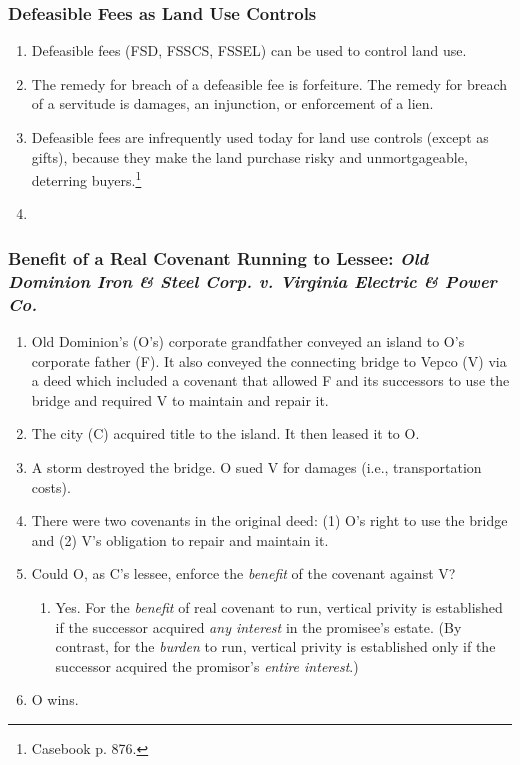\subsubsection{Defeasible Fees as Land Use Controls}

\begin{enumerate}
    \item Defeasible fees (FSD, FSSCS, FSSEL) can be used to control land use.
    \item The remedy for breach of a defeasible fee is forfeiture. The remedy 
    for breach of a servitude is damages, an injunction, or enforcement of a 
    lien.
    \item Defeasible fees are infrequently used today for land use controls 
    (except as gifts), because they make the land purchase risky and 
    unmortgageable, deterring buyers.\footnote{Casebook p. 876.}
    \item %
\end{enumerate}

\subsubsection{Benefit of a Real Covenant Running to Lessee: \emph{Old 
Dominion Iron \& Steel Corp. v. Virginia Electric \& Power Co.}}

\begin{enumerate}
    \item Old Dominion's (O's) corporate grandfather conveyed an island to O's 
    corporate father (F). It also conveyed the connecting bridge to Vepco (V) 
    via a deed which included a covenant that allowed F and its successors to 
    use the bridge and required V to maintain and repair it.
    \item The city (C) acquired title to the island. It then leased it to O.
    \item A storm destroyed the bridge. O sued V for damages (i.e., 
    transportation costs).
    \item There were two covenants in the original deed: (1) O's right to use 
    the bridge and (2) V's obligation to repair and maintain it.
    \item Could O, as C's lessee, enforce the \emph{benefit} of the covenant 
    against V?
    \begin{enumerate}
        \item Yes. For the \emph{benefit} of real covenant to run, vertical 
        privity is established if the successor acquired \emph{any interest} 
        in the promisee's estate. (By contrast, for the \emph{burden} to run, 
        vertical privity is established only if the successor acquired the 
        promisor's \emph{entire interest}.)
    \end{enumerate}
    \item O wins.
\end{enumerate}

